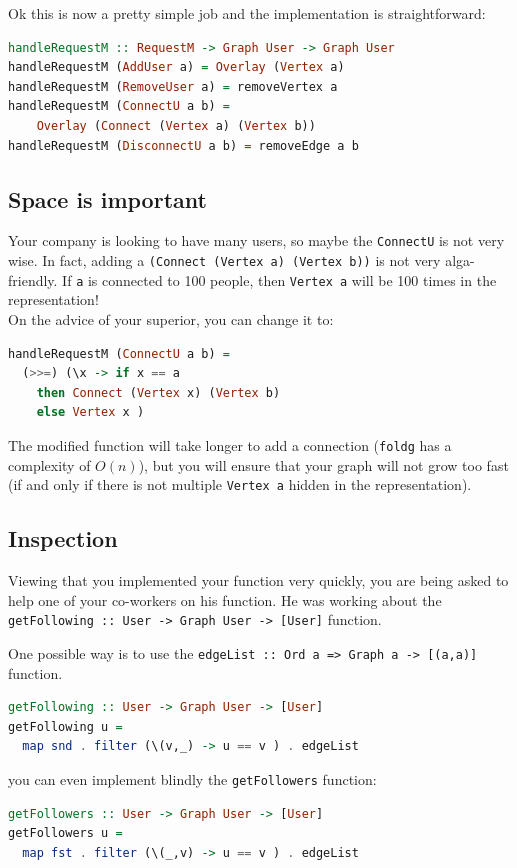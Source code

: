 \documentclass[10pt,a4paper]{article}
\begin{document}
Ok this is now a pretty simple job and the implementation is straightforward:
\begin{lstlisting}[language=Haskell, frame=single]
handleRequestM :: RequestM -> Graph User -> Graph User
handleRequestM (AddUser a) = Overlay (Vertex a)
handleRequestM (RemoveUser a) = removeVertex a
handleRequestM (ConnectU a b) =
	Overlay (Connect (Vertex a) (Vertex b))
handleRequestM (DisconnectU a b) = removeEdge a b
\end{lstlisting}

\subsection{Space is important}
Your company is looking to have many users, so maybe the \verb|ConnectU| is not very wise. In fact, adding a \verb|(Connect (Vertex a) (Vertex b))| is not very alga-friendly. If \verb|a| is connected to 100 people, then \verb|Vertex a| will be 100 times in the representation!
\\
On the advice of your superior, you can change it to:
\begin{lstlisting}[language=Haskell, frame=single]
handleRequestM (ConnectU a b) =
  (>>=) (\x -> if x == a
    then Connect (Vertex x) (Vertex b)
    else Vertex x )
\end{lstlisting}
The modified function will take longer to add a connection (\verb|foldg| has a complexity of $O(n)$), but you will ensure that your graph will not grow too fast (if and only if there is not multiple \verb|Vertex a| hidden in the representation).

\subsection{Inspection}
Viewing that you implemented your function very quickly, you are being asked to help one of your co-workers on his function. He was working about the \verb|getFollowing :: User -> Graph User -> [User]| function.

One possible way is to use the \verb|edgeList :: Ord a => Graph a -> [(a,a)]| function.

\begin{lstlisting}[language=Haskell, frame=single]
getFollowing :: User -> Graph User -> [User]
getFollowing u =
  map snd . filter (\(v,_) -> u == v ) . edgeList
\end{lstlisting}

you can even implement blindly the \verb|getFollowers| function:
\begin{lstlisting}[language=Haskell, frame=single]
getFollowers :: User -> Graph User -> [User]
getFollowers u =
  map fst . filter (\(_,v) -> u == v ) . edgeList
\end{lstlisting}
\end{document}
